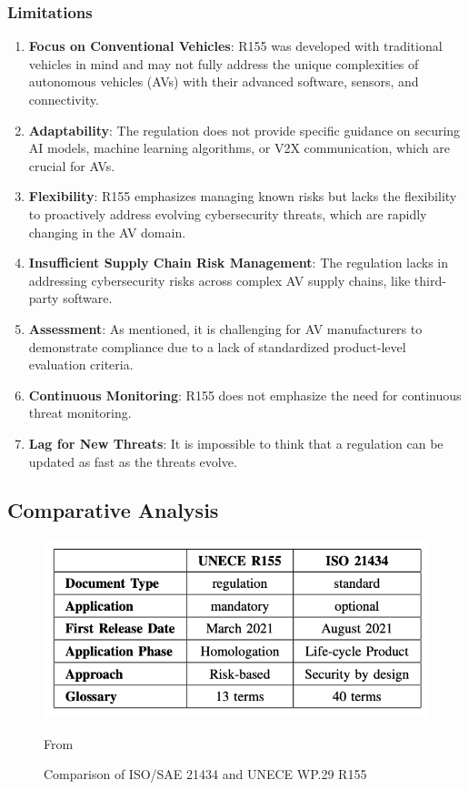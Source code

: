 \subsubsection{Limitations}\label{subsubsec:limitations-2}
\begin{enumerate}
    \item \textbf{Focus on Conventional Vehicles}: R155 was developed with traditional vehicles in mind and may not fully address the unique complexities of autonomous vehicles (AVs) with their advanced software, sensors, and connectivity.
    \item \textbf{Adaptability}: The regulation does not provide specific guidance on securing AI models, machine learning algorithms, or V2X communication, which are crucial for AVs.
    \item \textbf{Flexibility}: R155 emphasizes managing known risks but lacks the flexibility to proactively address evolving cybersecurity threats, which are rapidly changing in the AV domain.
    \item \textbf{Insufficient Supply Chain Risk Management}: The regulation lacks in addressing cybersecurity risks across complex AV supply chains, like third-party software.
    \item \textbf{Assessment}: As mentioned, it is challenging for AV manufacturers to demonstrate compliance due to a lack of standardized product-level evaluation criteria.
    \item \textbf{Continuous Monitoring}: R155 does not emphasize the need for continuous threat monitoring.
    \item \textbf{Lag for New Threats}: It is impossible to think that a regulation can be updated as fast as the threats evolve.
\end{enumerate}


\subsection{Comparative Analysis}\label{subsec:comparative-analysis}
\begin{figure}[!htb]
    \centering
    \includegraphics[width=0.7\linewidth]{figures/diff-standards}
    \caption{Comparison of ISO/SAE 21434 and UNECE WP.29 R155}
    \footnotesize{From \cite{comparison-standard} }
    \label{fig:comparison}
\end{figure}

